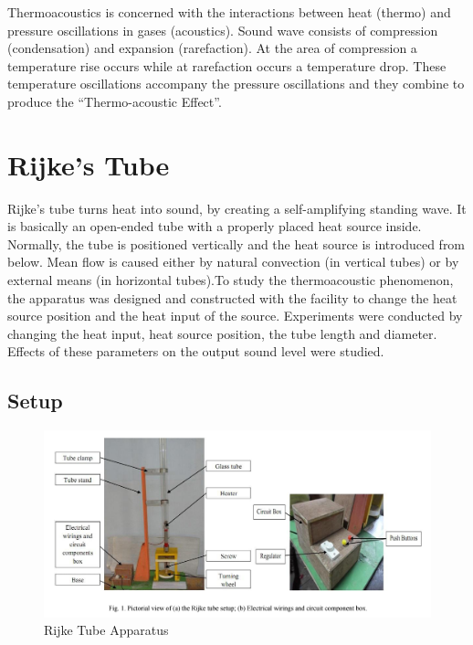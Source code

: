\documentclass[8pt]{article} %
\begin{document}
Thermoacoustics is concerned with the interactions between heat (thermo) and pressure oscillations in gases (acoustics). Sound wave consists of compression (condensation) and expansion (rarefaction). At the area of compression a temperature rise occurs while at rarefaction occurs a temperature drop. These temperature oscillations accompany the pressure oscillations and they combine to produce the “Thermo-acoustic Effect”.\cite{Thermoacoustic Instability} 

\section{Rijke's Tube}

Rijke's tube turns heat into sound, by creating a self-amplifying standing wave. It is basically an open-ended tube with a properly placed heat source inside.  Normally, the tube is positioned vertically and the heat source is introduced from below. Mean flow is caused either by natural convection (in vertical tubes) or by external means (in horizontal tubes).To study the thermoacoustic phenomenon, the apparatus was designed and constructed with the facility to change the heat source position and the heat input of the source.  Experiments were conducted by changing the heat input, heat source position, the tube length and diameter. Effects of these parameters on the output sound level were studied. \cite{Rijke Tube Article}

\subsection{Setup}
\begin{figure}[H] 
\centering
\includegraphics[width=0.9\columnwidth]{./rijketube.png}
\caption{Rijke Tube Apparatus}
\label{fig:Rijke Tube Apparatus}
\end{figure}
\end{document}
